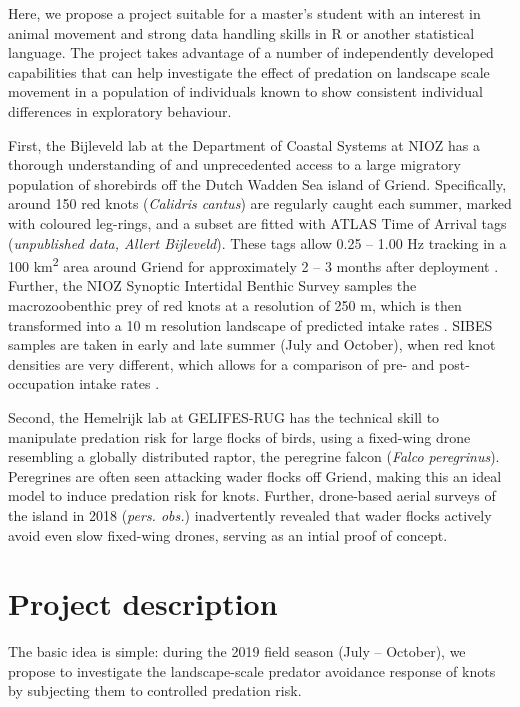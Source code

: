 \documentclass[10pt]{article}
\begin{document}
\begin{spacing}{1.15}
Here, we propose a project suitable for a master's student with an interest in animal movement and strong data handling skills in R or another statistical language. The project takes advantage of a number of independently developed capabilities that can help investigate the effect of predation on landscape scale movement in a population of individuals known to show consistent individual differences in exploratory behaviour. 

First, the Bijleveld lab at the Department of Coastal Systems at NIOZ has a thorough understanding of and unprecedented access to a large migratory population of shorebirds off the Dutch Wadden Sea island of Griend. Specifically, around 150 red knots (\emph{Calidris cantus}) are regularly caught each summer, marked with coloured leg-rings, and a subset are fitted with ATLAS Time of Arrival tags (\emph{unpublished data, Allert Bijleveld}). These tags allow 0.25 -- 1.00 Hz tracking in a 100 km\textsuperscript{2} area around Griend for approximately 2 -- 3 months after deployment \autocite{maccurdy2015, oudman2018}. Further, the NIOZ Synoptic Intertidal Benthic Survey samples the macrozoobenthic prey of red knots at a resolution of 250 m, which is then transformed into a 10 m resolution landscape of predicted intake rates \autocite{bijleveld2015c, bijleveld2012, oudman2018, bijleveld2016}. 
SIBES samples are taken in early and late summer (July and October), when red knot densities are very different, which allows for a comparison of pre- and post-occupation intake rates \autocite[see][]{bijleveld2015c}.

Second, the Hemelrijk lab at GELIFES-RUG has the technical skill to manipulate predation risk for large flocks of birds, using a fixed-wing drone resembling a globally distributed raptor, the peregrine falcon (\emph{Falco peregrinus}). Peregrines are often seen attacking wader flocks off Griend, making this an ideal model to induce predation risk for knots. Further, drone-based aerial surveys of the island in 2018 (\emph{pers. obs.}) inadvertently revealed that wader flocks actively avoid even slow fixed-wing drones, serving as an intial proof of concept.

\section{Project description}

The basic idea is simple: during the 2019 field season (July -- October), we propose to investigate the landscape-scale predator avoidance response of knots by subjecting them to controlled predation risk. 


\end{spacing}
\end{document}
